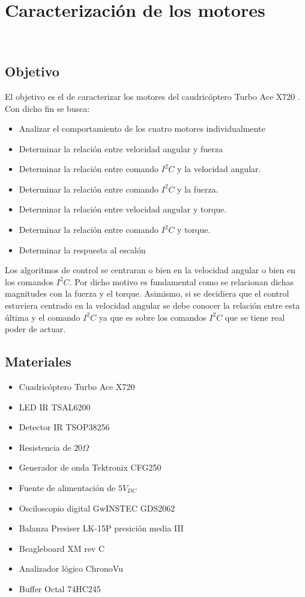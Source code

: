 \documentclass[main]{subfiles}
\begin{document}
\chapter{Caracterizaci\'on de los motores}\
\label{chap:motores}
\section{Objetivo}
El objetivo es el de caracterizar los motores del caudric\'optero Turbo Ace X720 . Con dicho fin se busca:

\begin{itemize}
\item Analizar el comportamiento de los cuatro motores individualmente
\item Determinar la relaci\'on entre velocidad angular y fuerza
\item Determinar la relaci\'on entre comando $I^2C$ y la velocidad angular.
\item Determinar la relaci\'on entre comando $I^2C$ y la fuerza.
\item Determinar la relaci\'on entre velocidad angular y torque.
\item Determinar la relaci\'on entre comando $I^2C$ y torque.
\item Determinar la respuesta al escal\'on
\end{itemize}

Los algoritmos de control se centraran o bien en la velocidad angular o bien en los comandos $I^2C$. Por dicho motivo es fundamental como se relacionan dichas magnitudes con la fuerza y el torque. Asimismo, si se decidiera que el control estuviera centrado en la velocidad angular se debe conocer la relaci\'on entre esta \'ultima y el comando $I^2C$ ya que es sobre los comandos $I^2C$ que se tiene real poder de actuar.

\section{Materiales}
\begin{itemize}
\item Cuadric\'optero Turbo Ace X720	
\item LED IR TSAL6200
\item Detector IR TSOP38256
\item Resistencia de $20 \Omega$
\item Generador de onda Tektronix CFG250
\item Fuente de alimentaci\'on de $5V_{DC}$
\item Osciloscopio digital GwINSTEC GDS2062
\item Balanza Presiser LK-15P presici\'on media III
\item Beagleboard XM rev C
\item Analizador l\'ogico ChronoVu
\item Buffer Octal 74HC245
\end{itemize}
\end{document}
